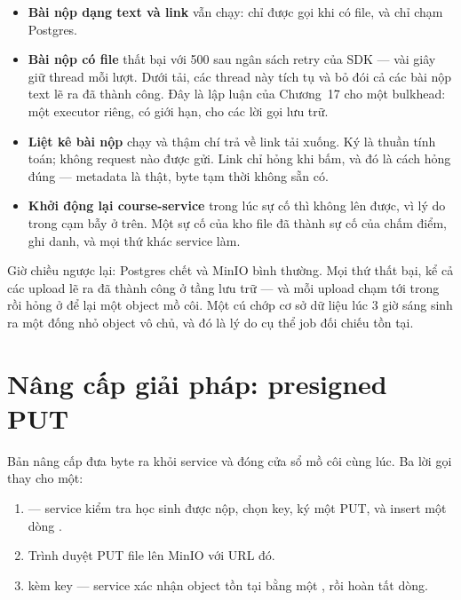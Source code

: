 \begin{itemize}
  \item \textbf{Bài nộp dạng text và link} vẫn chạy:  chỉ
  được gọi khi có file, và  chỉ chạm Postgres.
  \item \textbf{Bài nộp có file} thất bại với 500 sau ngân sách retry
  của SDK --- vài giây giữ thread mỗi lượt. Dưới tải, các thread này
  tích tụ và bỏ đói cả các bài nộp text lẽ ra đã thành công. Đây là lập
  luận của Chương~17 cho một bulkhead: một executor riêng, có giới hạn,
  cho các lời gọi lưu trữ.
  \item \textbf{Liệt kê bài nộp} chạy và thậm chí trả về link tải
  xuống. Ký là thuần tính toán; không request nào được gửi. Link chỉ
  hỏng khi bấm, và đó là cách hỏng đúng --- metadata là thật, byte tạm
  thời không sẵn có.
  \item \textbf{Khởi động lại course-service} trong lúc sự cố thì không
  lên được, vì lý do trong cạm bẫy ở trên. Một sự cố của kho file đã
  thành sự cố của chấm điểm, ghi danh, và mọi thứ khác service làm.
\end{itemize}

Giờ chiều ngược lại: Postgres chết và MinIO bình thường. Mọi thứ thất
bại, kể cả các upload lẽ ra đã thành công ở tầng lưu trữ --- và mỗi
upload chạm tới  trong  rồi hỏng ở  để lại một
object mồ côi. Một cú chớp cơ sở dữ liệu lúc 3 giờ sáng sinh ra một
đống nhỏ object vô chủ, và đó là lý do cụ thể job đối chiếu tồn tại.

\section{Nâng cấp giải pháp: presigned PUT}
\label{sec:presigned-put}

Bản nâng cấp đưa byte ra khỏi service và đóng cửa sổ mồ côi cùng lúc.
Ba lời gọi thay cho một:

\begin{enumerate}
  \item {} ---
  service kiểm tra học sinh được nộp, chọn key, ký một PUT, và insert
  một dòng .
  \item Trình duyệt PUT file lên MinIO với URL đó.
  \item {} kèm key --- service
  xác nhận object tồn tại bằng một , rồi hoàn tất dòng.
\end{enumerate}

